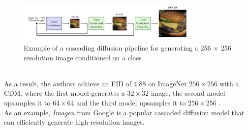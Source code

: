 \documentclass[twoside]{article}
\numberwithin{equation}{section}
\numberwithin{figure}{section}
\begin{document}
\begin{figure}[h]
  \begin{center}
    \includegraphics[width=0.8\textwidth]{images/cascading.png}
    \caption{Example of a cascading diffusion pipeline for generating a 256 $\times$ 256 resolution image conditioned on a class \cite{ho2021cascaded}}
  \end{center}
\end{figure}
\\
As a result, the authors achieve an FID of $4.88$ on ImageNet $256 \times 256$ with a CDM, where the first model generates a $32 \times 32$ image, the second model upsamples it to $64 \times 64$ and the third model upsamples it to $256 \times 256$ \cite{ho2021cascaded}. \\
As an example, \textit{Imagen} \cite{saharia2022photorealistic} from Google is a popular cascaded diffusion model that can efficiently generate high-resolution images. \\
\end{document}
